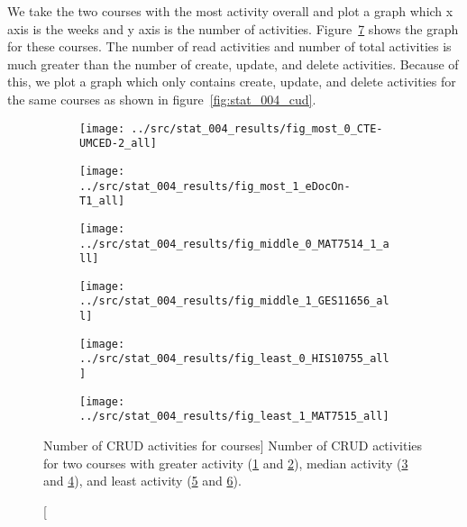 We take the two courses with the most activity overall and plot a graph which x
axis is the weeks and y axis is the number of activities.
Figure~\ref{fig:stat_004_all} shows the graph for these courses. The number of
read activities and number of total activities is much greater than the number
of create, update, and delete activities. Because of this, we plot a graph
which only contains create, update, and delete activities for the same courses
as shown in figure~\ref{fig:stat_004_cud}.

\begin{figure}[h!]
    \centering

    \begin{subfigure}{.5\textwidth}
        \centering
        \texttt{[image: ../src/stat\_004\_results/fig\_most\_0\_CTE-UMCED-2\_all]}
        \caption[]{}
        \label{subfig:stat_most_004_0_all}
    \end{subfigure}%
    \begin{subfigure}{.5\textwidth}
        \centering
        \texttt{[image: ../src/stat\_004\_results/fig\_most\_1\_eDocOn-T1\_all]}
        \caption[]{}
        \label{subfig:stat_most_004_1_all}
    \end{subfigure}

    \begin{subfigure}{.5\textwidth}
        \centering
        \texttt{[image: ../src/stat\_004\_results/fig\_middle\_0\_MAT7514\_1\_all]}
        \caption[]{}
        \label{subfig:stat_middle_004_0_all}
    \end{subfigure}%
    \begin{subfigure}{.5\textwidth}
        \centering
        \texttt{[image: ../src/stat\_004\_results/fig\_middle\_1\_GES11656\_all]}
        \caption[]{}
        \label{subfig:stat_middle_004_1_all}
    \end{subfigure}

    \begin{subfigure}{.5\textwidth}
        \centering
        \texttt{[image: ../src/stat\_004\_results/fig\_least\_0\_HIS10755\_all]}
        \caption[]{}
        \label{subfig:stat_least_004_0_all}
    \end{subfigure}%
    \begin{subfigure}{.5\textwidth}
        \centering
        \texttt{[image: ../src/stat\_004\_results/fig\_least\_1\_MAT7515\_all]}
        \caption[]{}
        \label{subfig:stat_least_004_1_all}
    \end{subfigure}

    \caption
        [Number of CRUD activities for courses]
        {Number of CRUD activities for two courses with greater activity
        (\ref{subfig:stat_most_004_0_all} and
        \ref{subfig:stat_most_004_1_all}), median activity
        (\ref{subfig:stat_middle_004_0_all} and
        \ref{subfig:stat_middle_004_1_all}), and least activity
        (\ref{subfig:stat_least_004_0_all} and
        \ref{subfig:stat_least_004_1_all}).}

    \label{fig:stat_004_all}
\end{figure}


